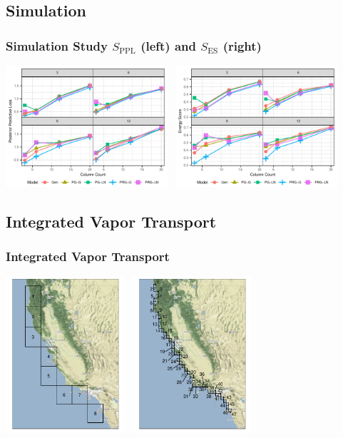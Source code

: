 \documentclass[aspectratio=169]{beamer}
\begin{document}
\subsection{Simulation}
\begin{frame}
  \frametitle{Simulation Study $S_{\text{PPL}}$ (left) and $S_{\text{ES}}$ (right)}
  \begin{center}
    \includegraphics[width=0.45\textwidth]{./images/simulation_ppl}~
    \hfill
    \includegraphics[width=0.45\textwidth]{./images/simulation_es}~
  \end{center}
\end{frame}

\subsection{Integrated Vapor Transport}
\begin{frame}
  \frametitle{Integrated Vapor Transport}
  \begin{center}
    \includegraphics[width=0.33\textwidth]{./images/erai_grid}~
    \;\;\;\;\;\;
    \includegraphics[width=0.33\textwidth]{./images/era5_grid}~
  \end{center}
\end{frame}
\end{document}
